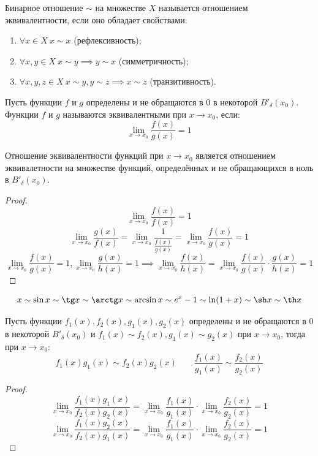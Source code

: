 \documentclass[12pt]{article}
\begin{document}
\begin{definition}
	Бинарное отношение $\sim$ на множестве $X$ называется отношением
	эквивалентности, если оно обладает свойствами:
	\begin{center}
		\begin{minipage}{0.65\textwidth}
			\begin{enumerate}[itemsep=0pt]
				\item $\forall x\in X\ x\sim x$ (рефлексивность);
				\item $\forall x,y\in X\ x\sim y\implies y\sim x$ (симметричность);
				\item $\forall x, y, z\in X\ x\sim y, y\sim z\implies x\sim z$
					(транзитивность).
			\end{enumerate}
		\end{minipage}
	\end{center}
\end{definition}
\begin{definition}
	Пусть функции $f$ и $g$ определены и не обращаются в 0 в некоторой
	$B'_\delta(x_0)$. Функции $f$ и $g$ называются эквивалентными при
	$x\to x_0$, если:
	\[\lim_{x\to x_0}\frac{f(x)}{g(x)}=1\]
\end{definition}
\begin{lemma}
	Отношение эквивалентности функций при $x\to x_0$ является отношением
	эквивалетности на множестве функций, определённых и не обращающихся
	в ноль в $B'_\delta(x_0)$.
	\begin{proof}
		\[\tag{Рефлексивность}
		\lim_{x\to x_0}\frac{f(x)}{f(x)}=1\]
		\[\tag{Симметричность}
			\lim_{x\to x_0}\frac{g(x)}{f(x)}=\lim_{x\to
		x_0}\frac{1}{\frac{f(x)}{g(x)}}=\lim_{x\to x_0}\frac{f(x)}{g(x)}=1\]
		\[\tag{Транзитивность}
			\lim_{x\to x_0}\frac{f(x)}{g(x)}=1, \lim_{x\to
			x_0}\frac{g(x)}{h(x)}=1\implies \lim_{x\to
			x_0}\frac{f(x)}{h(x)}=\lim_{x\to
		x_0}\frac{f(x)}{g(x)}\cdot\frac{g(x)}{h(x)}=1\]
	\end{proof}
\end{lemma}
\begin{statement}
	\[x\sim\sin x\sim \tg x\sim \arctg x\sim \arcsin x\sim e^x-1\sim
	\ln(1+x)\sim \sh x\sim \th x\]
\end{statement}
\begin{lemma}
	Пусть функции $f_1(x), f_2(x), g_1(x), g_2(x)$ определены и не
	обращаются в 0 в некоторой $B'_\delta(x_0)$ и $f_1(x)\sim f_2(x),
	g_1(x)\sim g_2(x)$ при $x\to x_0$, тогда при $x\to x_0$:
	\[f_1(x)g_1(x)\sim
	f_2(x)g_2(x)\qquad\frac{f_1(x)}{g_1(x)}\sim\frac{f_2(x)}{g_2(x)}\]
	\begin{proof}
		\[\lim_{x\to x_0}\frac{f_1(x)g_1(x)}{f_2(x)g_2(x)}=\lim_{x\to
		x_0}\frac{f_1(x)}{g_1(x)}\cdot\lim_{x\to x_0}\frac{f_2(x)}{g_2(x)}=1\]
		\[\lim_{x\to x_0}\frac{f_1(x)g_2(x)}{f_2(x)g_1(x)}=\lim_{x\to
		x_0}\frac{f_1(x)}{g_1(x)}\cdot\lim_{x\to x_0}\frac{f_2(x)}{g_2(x)}=1\]
	\end{proof}
\end{lemma}
\end{document}
